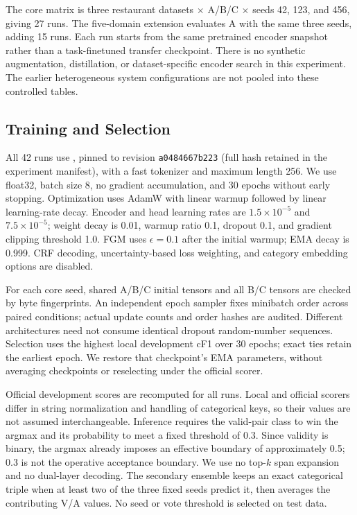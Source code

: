 \documentclass[conference]{IEEEtran}
\begin{document}
The core matrix is three restaurant datasets $\times$ A/B/C $\times$ seeds 42, 123, and 456, giving 27 runs. The five-domain extension evaluates A with the same three seeds, adding 15 runs. Each run starts from the same pretrained encoder snapshot rather than a task-finetuned transfer checkpoint. There is no synthetic augmentation, distillation, or dataset-specific encoder search in this experiment. The earlier heterogeneous system configurations are not pooled into these controlled tables.

\subsection{Training and Selection}
All 42 runs use , pinned to revision \texttt{a0484667b223} (full hash retained in the experiment manifest), with a fast tokenizer and maximum length 256. We use float32, batch size 8, no gradient accumulation, and 30 epochs without early stopping. Optimization uses AdamW with linear warmup followed by linear learning-rate decay. Encoder and head learning rates are $1.5\times10^{-5}$ and $7.5\times10^{-5}$; weight decay is 0.01, warmup ratio 0.1, dropout 0.1, and gradient clipping threshold 1.0. FGM uses $\epsilon=0.1$ after the initial warmup; EMA decay is 0.999. CRF decoding, uncertainty-based loss weighting, and category embedding options are disabled.

For each core seed, shared A/B/C initial tensors and all B/C tensors are checked by byte fingerprints. An independent epoch sampler fixes minibatch order across paired conditions; actual update counts and order hashes are audited. Different architectures need not consume identical dropout random-number sequences. Selection uses the highest local development cF1 over 30 epochs; exact ties retain the earliest epoch. We restore that checkpoint's EMA parameters, without averaging checkpoints or reselecting under the official scorer.

Official development scores are recomputed for all runs. Local and official scorers differ in string normalization and handling of categorical keys, so their values are not assumed interchangeable. Inference requires the valid-pair class to win the argmax and its probability to meet a fixed threshold of 0.3. Since validity is binary, the argmax already imposes an effective boundary of approximately 0.5; 0.3 is not the operative acceptance boundary. We use no top-$k$ span expansion and no dual-layer decoding. The secondary ensemble keeps an exact categorical triple when at least two of the three fixed seeds predict it, then averages the contributing V/A values. No seed or vote threshold is selected on test data.
\end{document}
